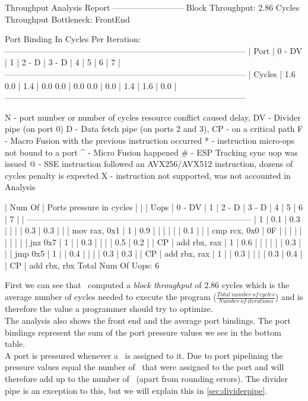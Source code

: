 \begin{example}
Throughput Analysis Report
--------------------------
Block Throughput: 2.86 Cycles       Throughput Bottleneck: FrontEnd

Port Binding In Cycles Per Iteration:
---------------------------------------------------------------------------------------
|  Port  |  0   -  DV  |  1   |  2   -  D   |  3   -  D   |  4   |  5   |  6   |  7   |
---------------------------------------------------------------------------------------
| Cycles | 1.6    0.0  | 1.4  | 0.0    0.0  | 0.0    0.0  | 0.0  | 1.4  | 1.6  | 0.0  |
---------------------------------------------------------------------------------------

N - port number or number of cycles resource conflict caused delay, DV - Divider pipe (on port 0)
D - Data fetch pipe (on ports 2 and 3), CP - on a critical path
F - Macro Fusion with the previous instruction occurred
* - instruction micro-ops not bound to a port
^ - Micro Fusion happened
# - ESP Tracking sync uop was issued
@ - SSE instruction followed an AVX256/AVX512 instruction, dozens of cycles penalty is expected
X - instruction not supported, was not accounted in Analysis

| Num Of |                    Ports pressure in cycles                     |    |
|  Uops  |  0  - DV  |  1  |  2  -  D  |  3  -  D  |  4  |  5  |  6  |  7  |    |
---------------------------------------------------------------------------------
|   1    | 0.1       | 0.3 |           |           |     | 0.3 | 0.3 |     |    | mov rax, 0x1
|   1    | 0.9       |     |           |           |     |     | 0.1 |     |    | cmp rcx, 0x0
|   0F   |           |     |           |           |     |     |     |     |    | jnz 0x7
|   1    |           | 0.3 |           |           |     | 0.5 | 0.2 |     | CP | add rbx, rax
|   1    | 0.6       |     |           |           |     |     | 0.3 |     |    | jmp 0x5
|   1    |           | 0.4 |           |           |     | 0.3 | 0.3 |     | CP | add rbx, rax
|   1    |           | 0.3 |           |           |     | 0.3 | 0.4 |     | CP | add rbx, rbx
Total Num Of Uops: 6
\end{example}

First we can see that \iaca\ computed a \emph{block throughput} of $2.86$ cycles which is the average number of cycles needed to execute the program ($\frac{Total\ number\ of\ cycles}{Number\ of\ iterations}$) and is therefore the value a programmer should try to optimize.\\
The analysis also shows the front end and the average port bindings. The port bindings represent the sum of the port pressure values we see in the bottom table.\\
A port is pressured whenever a \microop\ is assigned to it. Due to port pipelining the pressure values equal the number of \microops\ that were assigned to the port and will therefore add up to the number of \microops\ (apart from rounding errors). The divider pipe is an exception to this, but we will explain this in \autoref{sec:dividerpipe}.
 
